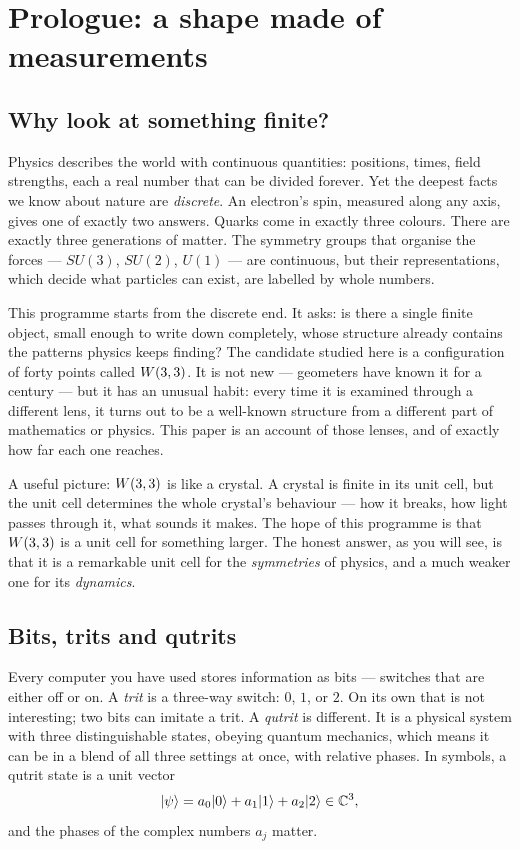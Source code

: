 \section{Prologue: a shape made of measurements}
\label{sec:prologue}

\subsection{Why look at something finite?}

Physics describes the world with continuous quantities: positions, times, field
strengths, each a real number that can be divided forever. Yet the deepest facts we
know about nature are \emph{discrete}. An electron's spin, measured along any axis,
gives one of exactly two answers. Quarks come in exactly three colours. There are
exactly three generations of matter. The symmetry groups that organise the forces ---
$SU(3)$, $SU(2)$, $U(1)$ --- are continuous, but their representations, which decide
what particles can exist, are labelled by whole numbers.

This programme starts from the discrete end. It asks: is there a single finite object,
small enough to write down completely, whose structure already contains the patterns
physics keeps finding? The candidate studied here is a configuration of forty points
called $W(3,3)$. It is not new --- geometers have known it for a century --- but it has an
unusual habit: every time it is examined through a different lens, it turns out to be
a well-known structure from a different part of mathematics or physics. This paper is
an account of those lenses, and of exactly how far each one reaches.

\begin{plainwords}
A useful picture: $W(3,3)$ is like a crystal. A crystal is finite in its unit cell, but
the unit cell determines the whole crystal's behaviour --- how it breaks, how light
passes through it, what sounds it makes. The hope of this programme is that $W(3,3)$ is a
unit cell for something larger. The honest answer, as you will see, is that it is
a remarkable unit cell for the \emph{symmetries} of physics, and a much weaker one for
its \emph{dynamics}.
\end{plainwords}

\subsection{Bits, trits and qutrits}

Every computer you have used stores information as bits --- switches that are either
off or on. A \emph{trit} is a three-way switch: $0$, $1$, or $2$. On its own that is
not interesting; two bits can imitate a trit. A \emph{qutrit} is different. It is a
physical system with three distinguishable states, obeying quantum mechanics, which
means it can be in a blend of all three settings at once, with relative phases. In
symbols, a qutrit state is a unit vector
\[
\lvert \psi\rangle=a_0\lvert 0\rangle+a_1\lvert 1\rangle+a_2\lvert 2\rangle\in\mathbb{C}^3 ,
\]
and the phases of the complex numbers $a_j$ matter.

